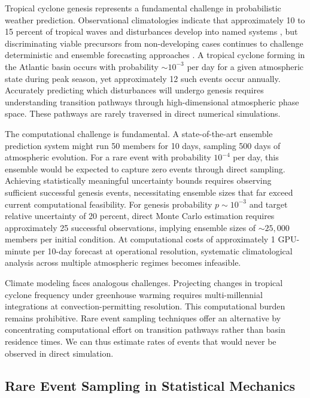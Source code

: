 \documentclass[11pt]{article}
\begin{document}
Tropical cyclone genesis represents a fundamental challenge in probabilistic weather prediction. Observational climatologies indicate that approximately 10 to 15 percent of tropical waves and disturbances develop into named systems \citep{Frank1970,Landsea1998}, but discriminating viable precursors from non-developing cases continues to challenge deterministic and ensemble forecasting approaches \citep{Titley2019,Halperin2013}. A tropical cyclone forming in the Atlantic basin occurs with probability $\sim 10^{-3}$ per day for a given atmospheric state during peak season, yet approximately 12 such events occur annually. Accurately predicting which disturbances will undergo genesis requires understanding transition pathways through high-dimensional atmospheric phase space. These pathways are rarely traversed in direct numerical simulations.

The computational challenge is fundamental. A state-of-the-art ensemble prediction system might run 50 members for 10 days, sampling 500 days of atmospheric evolution. For a rare event with probability $10^{-4}$ per day, this ensemble would be expected to capture zero events through direct sampling. Achieving statistically meaningful uncertainty bounds requires observing sufficient successful genesis events, necessitating ensemble sizes that far exceed current computational feasibility. For genesis probability $p \sim 10^{-3}$ and target relative uncertainty of 20 percent, direct Monte Carlo estimation requires approximately 25 successful observations, implying ensemble sizes of $\sim 25,000$ members per initial condition. At computational costs of approximately 1 GPU-minute per 10-day forecast at operational resolution, systematic climatological analysis across multiple atmospheric regimes becomes infeasible.

Climate modeling faces analogous challenges. Projecting changes in tropical cyclone frequency under greenhouse warming requires multi-millennial integrations at convection-permitting resolution. This computational burden remains prohibitive. Rare event sampling techniques offer an alternative by concentrating computational effort on transition pathways rather than basin residence times. We can thus estimate rates of events that would never be observed in direct simulation.

\subsection{Rare Event Sampling in Statistical Mechanics}
\end{document}
